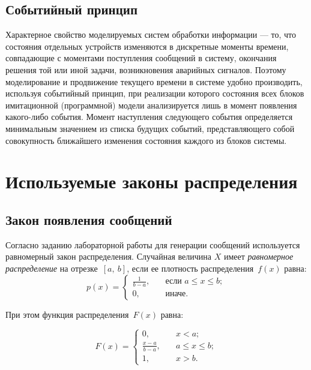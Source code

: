 \subsection*{Событийный принцип}

Характерное свойство моделируемых систем обработки информации --- то, что состояния отдельных устройств изменяются в дискретные моменты времени, совпадающие с моментами поступления сообщений в систему, окончания решения той или иной задачи, возникновения аварийных сигналов. Поэтому моделирование и продвижение текущего времени в системе удобно производить, используя событийный принцип, при реализации которого состояния всех блоков имитационной (программной) модели анализируется лишь в момент появления какого-либо события. 
Момент наступления следующего события определяется минимальным значением из списка будущих событий, представляющего собой совокупность ближайшего изменения состояния каждого из блоков системы.

\section{Используемые законы распределения}

\subsection*{Закон появления сообщений}

Согласно заданию лабораторной работы для генерации сообщений используется равномерный закон распределения.
Случайная величина $X$ имеет \textit{равномерное распределение} на отрезке~$[a,~b]$, если ее плотность распределения~$f(x)$ равна:
\begin{equation}
	p(x) =
	\begin{cases}
		\displaystyle\frac{1}{b - a}, & \quad \text{если } a \leq x \leq b;\\
		0,  & \quad \text{иначе}.
	\end{cases}
\end{equation}

При этом функция распределения~$F(x)$ равна:

\begin{equation}
	F(x) =
	\begin{cases}
		0,  & \quad x < a;\\
		\displaystyle\frac{x - a}{b - a}, & \quad a \leq x \leq b;\\
		1,  & \quad x > b.
	\end{cases}
\end{equation}

